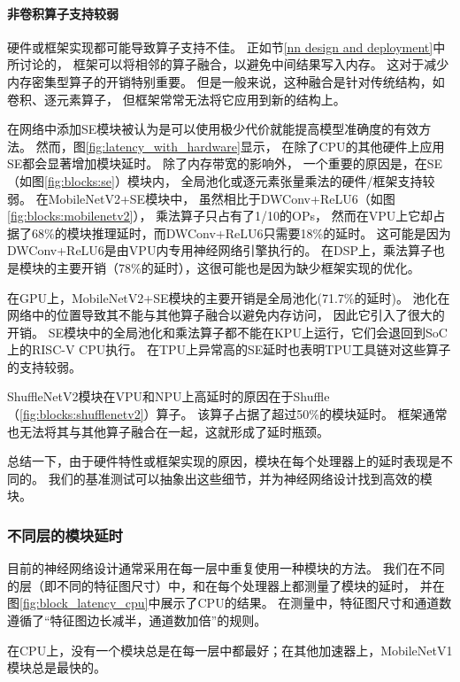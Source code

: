 \paragraph{非卷积算子支持较弱}
硬件或框架实现都可能导致算子支持不佳。
正如节\ref{nn design and deployment}中所讨论的，
框架可以将相邻的算子融合，以避免中间结果写入内存。
这对于减少内存密集型算子的开销特别重要。
但是一般来说，这种融合是针对传统结构，如卷积、逐元素算子，
但框架常常无法将它应用到新的结构上。

在网络中添加SE模块被认为是可以使用极少代价就能提高模型准确度的有效方法。
然而，图\ref{fig:latency_with_hardware}显示，
在除了CPU的其他硬件上应用SE都会显著增加模块延时。
除了内存带宽的影响外，
一个重要的原因是，在SE（如图\ref{fig:blocks:se}）模块内，
全局池化或逐元素张量乘法的硬件/框架支持较弱。
在MobileNetV2+SE模块中，
虽然相比于DWConv+ReLU6（如图\ref{fig:blocks:mobilenetv2}），
乘法算子只占有了1/10的OPs，
然而在VPU上它却占据了68\%的模块推理延时，而DWConv+ReLU6只需要18\%的延时。
这可能是因为DWConv+ReLU6是由VPU内专用神经网络引擎执行的。
在DSP上，乘法算子也是模块的主要开销（78\%的延时），这很可能也是因为缺少框架实现的优化。

在GPU上，MobileNetV2+SE模块的主要开销是全局池化(71.7\%的延时)。
池化在网络中的位置导致其不能与其他算子融合以避免内存访问，
因此它引入了很大的开销。
SE模块中的全局池化和乘法算子都不能在KPU上运行，它们会退回到SoC上的RISC-V CPU执行。
在TPU上异常高的SE延时也表明TPU工具链对这些算子的支持较弱。

ShuffleNetV2模块在VPU和NPU上高延时的原因在于Shuffle（\ref{fig:blocks:shufflenetv2}）算子。
该算子占据了超过50\%的模块延时。
框架通常也无法将其与其他算子融合在一起，这就形成了延时瓶颈。

总结一下，由于硬件特性或框架实现的原因，模块在每个处理器上的延时表现是不同的。
我们的基准测试可以抽象出这些细节，并为神经网络设计找到高效的模块。

\subsubsection{不同层的模块延时}
\label{analysis:op block:block with layer}


目前的神经网络设计通常采用在每一层中重复使用一种模块的方法。
我们在不同的层（即不同的特征图尺寸）中，和在每个处理器上都测量了模块的延时，
并在图\ref{fig:block_latency_cpu}中展示了CPU的结果。
在测量中，特征图尺寸和通道数遵循了``特征图边长减半，通道数加倍''的规则。

\begin{finding}
    在CPU上，没有一个模块总是在每一层中都最好；在其他加速器上，MobileNetV1模块总是最快的。
\end{finding}

